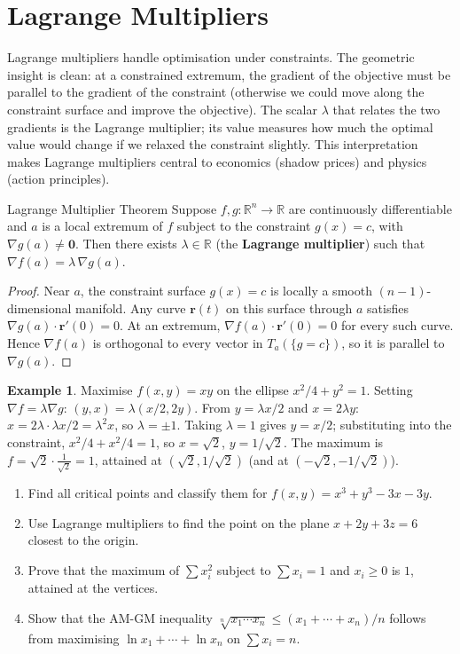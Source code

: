 \documentclass[12pt, openany]{book}
\theoremstyle{plain}
\theoremstyle{definition}
\newtheorem{example}[theorem]{Example}
\theoremstyle{remark}
\newcommand{\R}{\mathbb{R}}
\begin{document}
\section{Lagrange Multipliers}

Lagrange multipliers handle optimisation under constraints.  The geometric insight is clean: at a constrained extremum, the gradient of the objective must be parallel to the gradient of the constraint (otherwise we could move along the constraint surface and improve the objective).  The scalar $\lambda$ that relates the two gradients is the Lagrange multiplier; its value measures how much the optimal value would change if we relaxed the constraint slightly.  This interpretation makes Lagrange multipliers central to economics (shadow prices) and physics (action principles).

\begin{thmbox}{Lagrange Multiplier Theorem}
Suppose $f,g:\R^n\to\R$ are continuously differentiable and $a$ is a local
extremum of $f$ subject to the constraint $g(x)=c$, with $\nabla g(a)\neq\mathbf{0}$.
Then there exists $\lambda\in\R$ (the \textbf{Lagrange multiplier}) such that
$\nabla f(a)=\lambda\,\nabla g(a)$.
\end{thmbox}
\color{black}

\begin{proof}
Near $a$, the constraint surface $g(x)=c$ is locally a smooth $(n-1)$-dimensional
manifold.  Any curve $\mathbf{r}(t)$ on this surface through $a$ satisfies
$\nabla g(a)\cdot\mathbf{r}'(0)=0$.  At an extremum, $\nabla f(a)\cdot\mathbf{r}'(0)=0$
for every such curve.  Hence $\nabla f(a)$ is orthogonal to every vector in
$T_a(\{g=c\})$, so it is parallel to $\nabla g(a)$.
\end{proof}

\begin{example}
Maximise $f(x,y)=xy$ on the ellipse $x^2/4+y^2=1$.
Setting $\nabla f=\lambda\nabla g$: $(y,x)=\lambda(x/2,2y)$.
From $y=\lambda x/2$ and $x=2\lambda y$: $x=2\lambda\cdot\lambda x/2=\lambda^2 x$,
so $\lambda=\pm 1$.  Taking $\lambda = 1$ gives $y = x/2$; substituting into the constraint, $x^2/4 + x^2/4 = 1$, so $x = \sqrt{2}$, $y = 1/\sqrt{2}$.  The maximum is $f = \sqrt{2}\cdot\tfrac{1}{\sqrt{2}} = 1$, attained at $(\sqrt{2},1/\sqrt{2})$ (and at $(-\sqrt{2},-1/\sqrt{2})$).
\end{example}

\begin{exbox}
\begin{enumerate}
  \item Find all critical points and classify them for
        $f(x,y)=x^3+y^3-3x-3y$.
  \item Use Lagrange multipliers to find the point on the plane $x+2y+3z=6$
        closest to the origin.
  \item Prove that the maximum of $\sum x_i^2$ subject to $\sum x_i=1$ and
        $x_i\geq 0$ is $1$, attained at the vertices.
  \item Show that the AM-GM inequality $\sqrt[n]{x_1\cdots x_n}\leq(x_1+\cdots+x_n)/n$
        follows from maximising $\ln x_1+\cdots+\ln x_n$ on $\sum x_i=n$.
\end{enumerate}
\end{exbox}
\color{black}
\end{document}
